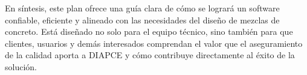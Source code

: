 En síntesis, este plan ofrece una guía clara de cómo se logrará un software confiable, eficiente y alineado con las necesidades del diseño de mezclas de concreto. Está diseñado no solo para el equipo técnico, sino también para que clientes, usuarios y demás interesados comprendan el valor que el aseguramiento de la calidad aporta a DIAPCE y cómo contribuye directamente al éxito de la solución.
